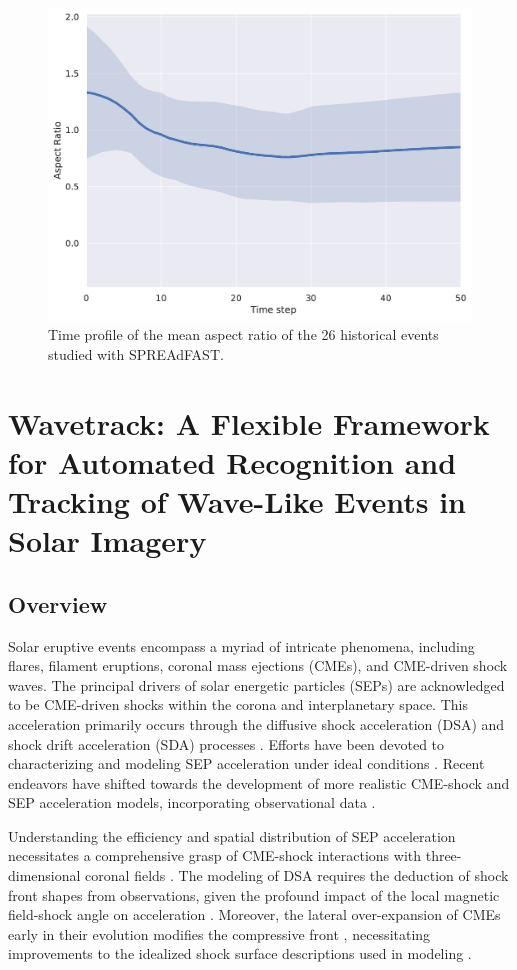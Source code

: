 \begin{figure}[!htp] %
	\centerline{\includegraphics[width=0.8\columnwidth]{chapter2/figs/mean_aspectratio_stat.pdf}}
	\caption{Time profile of the mean aspect ratio of the 26 historical events studied with SPREAdFAST.}
	\label{fig_mean_aspectratio_all}
\end{figure}


\section{Wavetrack: A Flexible Framework for Automated Recognition and Tracking of Wave-Like Events in Solar Imagery}
\subsection{Overview}
Solar eruptive events encompass a myriad of intricate phenomena, including flares, filament eruptions, coronal mass ejections (CMEs), and CME-driven shock waves. The principal drivers of solar energetic particles (SEPs) are acknowledged to be CME-driven shocks within the corona and interplanetary space. This acceleration primarily occurs through the diffusive shock acceleration (DSA) and shock drift acceleration (SDA) processes \citep{reames_2021}. Efforts have been devoted to characterizing and modeling SEP acceleration under ideal conditions \citep{vainio_2008, sokolov_2009, kozarev_2013}. Recent endeavors have shifted towards the development of more realistic CME-shock and SEP acceleration models, incorporating observational data \citep{vourlidas_2012, kwon_2014, kozarev_2015, kozarev_2019}.

Understanding the efficiency and spatial distribution of SEP acceleration necessitates a comprehensive grasp of CME-shock interactions with three-dimensional coronal fields \cite{rouillard_2016}. The modeling of DSA requires the deduction of shock front shapes from observations, given the profound impact of the local magnetic field-shock angle on acceleration \cite{guo_2013}. Moreover, the lateral over-expansion of CMEs early in their evolution modifies the compressive front \cite{bein_2011, temmer_2016}, necessitating improvements to the idealized shock surface descriptions used in modeling \citep{vourlidas_2012, kwon_2014, rouillard_2016}.

